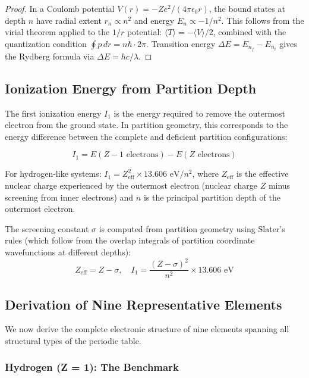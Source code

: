 \documentclass[11pt,twocolumn,a4paper]{article}
\theoremstyle{definition}
\theoremstyle{remark}
\begin{document}
\begin{proof}
In a Coulomb potential $V(r) = -Ze^2/(4\pi\epsilon_0 r)$, the bound states at depth $n$ have radial extent $r_n \propto n^2$ and energy $E_n \propto -1/n^2$. This follows from the virial theorem applied to the $1/r$ potential: $\langle T \rangle = -\langle V \rangle / 2$, combined with the quantization condition $\oint p \, dr = n\hbar \cdot 2\pi$. Transition energy $\Delta E = E_{n_f} - E_{n_i}$ gives the Rydberg formula via $\Delta E = hc/\lambda$.
\end{proof}

\subsection{Ionization Energy from Partition Depth}

The first ionization energy $I_1$ is the energy required to remove the outermost electron from the ground state. In partition geometry, this corresponds to the energy difference between the complete and deficient partition configurations:

\begin{equation}
I_1 = E(Z-1 \text{ electrons}) - E(Z \text{ electrons})
\label{eq:ionization}
\end{equation}

For hydrogen-like systems: $I_1 = Z_{\mathrm{eff}}^2 \times 13.606 \text{ eV} / n^2$, where $Z_{\mathrm{eff}}$ is the effective nuclear charge experienced by the outermost electron (nuclear charge $Z$ minus screening from inner electrons) and $n$ is the principal partition depth of the outermost electron.

The screening constant $\sigma$ is computed from partition geometry using Slater's rules (which follow from the overlap integrals of partition coordinate wavefunctions at different depths):
\begin{equation}
Z_{\mathrm{eff}} = Z - \sigma, \quad I_1 = \frac{(Z - \sigma)^2}{n^2} \times 13.606 \text{ eV}
\label{eq:slater}
\end{equation}

\subsection{Derivation of Nine Representative Elements}

We now derive the complete electronic structure of nine elements spanning all structural types of the periodic table.

\subsubsection{Hydrogen (Z = 1): The Benchmark}
\end{document}
